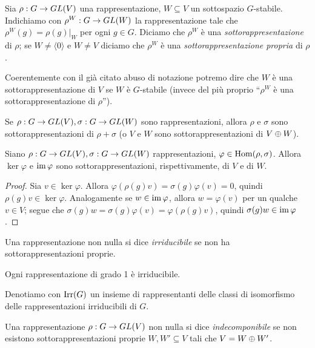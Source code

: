 \begin{definition}
Sia $\rho:G\to GL(V)$ una rappresentazione, $W\subseteq V$ un sottospazio $G$-stabile. Indichiamo con $\rho^W:G\to GL(W)$ la rappresentazione tale che $\rho^W(g)=\rho(g)|_W$ per ogni $g\in G$. Diciamo che $\rho^W$ è una \emph{sottorappresentazione} di $\rho$; se $W\neq\langle0\rangle$ e $W\neq V$ diciamo che $\rho^W$ è una \emph{sottorappresentazione propria} di $\rho$.
\end{definition}

Coerentemente con il già citato abuso di notazione potremo dire che $W$ è una sottorappresentazione di $V$ se $W$ è $G$-stabile (invece del più proprio ``$\rho^W$ è una sottorappresentazione di $\rho$'').

\begin{example}
Se $\rho:G\to GL(V),\allowbreak\sigma:G\to GL(W)$ sono rappresentazioni, allora $\rho$ e $\sigma$ sono sottorappresentazioni di $\rho+\sigma$ (o $V$ e $W$ sono sottorappresentazioni di $V\oplus W$).
\end{example}

\begin{proposition}
Siano $\rho:G\to GL(V),\allowbreak\sigma:G\to GL(W)$ rappresentazioni, $\varphi\in\operatorname{Hom}(\rho,\sigma)$. Allora $\ker\varphi$ e $\operatorname{im}\varphi$ sono sottorappresentazioni, rispettivamente, di $V$ e di $W$.
\end{proposition}
\begin{proof}
Sia $v\in\ker\varphi$. Allora $\varphi(\rho(g)v)=\sigma(g)\varphi(v)=0$, quindi $\rho(g)v\in\ker\varphi$. Analogamente se $w\in\operatorname{im}\varphi$, allora $w=\varphi(v)$ per un qualche $v\in V$; segue che $\sigma(g)w=\sigma(g)\varphi(v)=\varphi(\rho(g)v)$, quindi $\sigma(g)w\in\operatorname{im}\varphi$.
\end{proof}

\begin{definition}
Una rappresentazione non nulla si dice \emph{irriducibile} se non ha sottorappresentazioni proprie.
\end{definition}

\begin{example}
Ogni rappresentazione di grado 1 è irriducibile.
\end{example}

Denotiamo con $\operatorname{Irr}(G)$ un insieme di rappresentanti delle classi di isomorfismo delle rappresentazioni irriducibili di $G$.

\begin{definition}
Una rappresentazione $\rho:G\to GL(V)$ non nulla si dice \emph{indecomponibile} se non esistono sottorappresentazioni proprie $W\comma W'\subseteq V$ tali che $V=W\oplus W'$.
\end{definition}

